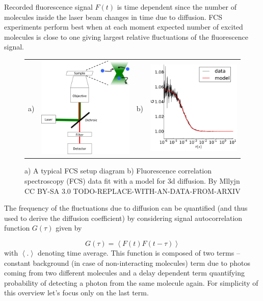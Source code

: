 \documentclass{doctoral}
\begin{document}
Recorded fluorescence signal $F(t)$ is time dependent since the number of molecules inside the laser beam changes in time due to diffusion.
FCS experiments perform best when at each moment expected number of excited molecules is close to one giving largest relative fluctuations of the fluorescence signal.

\begin{figure}[h]
    \centering
    \begin{tabular}{llll}
        a)                                                                     &
        \includegraphics[height=0.3\linewidth,valign=t]{figures/fcs_setup.png} &
        b)                                                                     &
        \includegraphics[height=0.32\linewidth,valign=t]{figures/fcs_data_and_fit.pdf}
    \end{tabular}

    \caption{a) A typical FCS setup diagram  b) Fluorescence correlation spectroscopy (FCS) data fit with a model for 3d diffusion.
        By Mllyjn CC BY-SA 3.0 TODO-REPLACE-WITH-AN-DATA-FROM-ARXIV} \label{fig:fcs_diagram}
\end{figure}

The frequency of the fluctuations due to diffusion can be quantified (and thus used to derive the diffusion coefficient) by considering signal autocorrelation function $G(\tau)$ given by 

\begin{equation}
    G(\tau) = \left< F(t) F(t-\tau) \right>
\end{equation}
with $\left< .
    \right>$ denoting time average.
This function is composed of two terms -- constant background (in case of non-interacting molecules) term due to photos coming from two different molecules and a delay dependent term quantifying probability of detecting a photon from the same molecule again.
For simplicity of this overview let's focus only on the last term.
\end{document}
